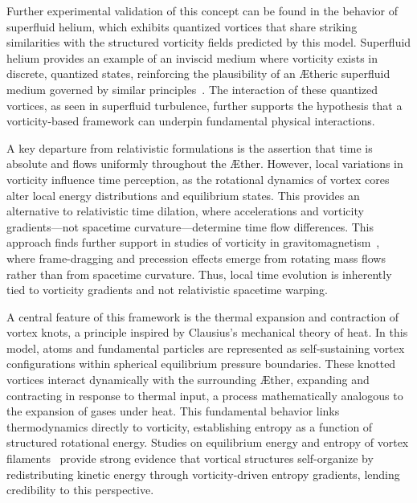 Further experimental validation of this concept can be found in the behavior of superfluid helium, which exhibits quantized vortices that share striking similarities with the structured vorticity fields predicted by this model.
Superfluid helium provides an example of an inviscid medium where vorticity exists in discrete, quantized states, reinforcing the plausibility of an Ætheric superfluid medium governed by similar principles~\cite{vinen2002}.
The interaction of these quantized vortices, as seen in superfluid turbulence, further supports the hypothesis that a vorticity-based framework can underpin fundamental physical interactions.

A key departure from relativistic formulations is the assertion that time is absolute and flows uniformly throughout the Æther.
However, local variations in vorticity influence time perception, as the rotational dynamics of vortex cores alter local energy distributions and equilibrium states.
This provides an alternative to relativistic time dilation, where accelerations and vorticity gradients—not spacetime curvature—determine time flow differences.
This approach finds further support in studies of vorticity in gravitomagnetism~\cite{cahill2005}, where frame-dragging and precession effects emerge from rotating mass flows rather than from spacetime curvature.
Thus, local time evolution is inherently tied to vorticity gradients and not relativistic spacetime warping.

A central feature of this framework is the thermal expansion and contraction of vortex knots, a principle inspired by Clausius’s mechanical theory of heat.
In this model, atoms and fundamental particles are represented as self-sustaining vortex configurations within spherical equilibrium pressure boundaries.
These knotted vortices interact dynamically with the surrounding Æther, expanding and contracting in response to thermal input, a process mathematically analogous to the expansion of gases under heat.
This fundamental behavior links thermodynamics directly to vorticity, establishing entropy as a function of structured rotational energy.
Studies on equilibrium energy and entropy of vortex filaments~\cite{belik2023} provide strong evidence that vortical structures self-organize by redistributing kinetic energy through vorticity-driven entropy gradients, lending credibility to this perspective.

